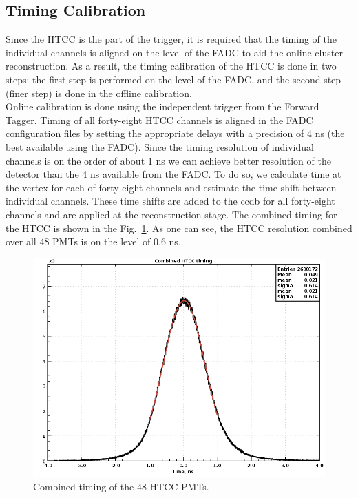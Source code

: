 \subsection{Timing Calibration} Since the HTCC is the part of the trigger, it is required that the timing of the individual channels is aligned on the level of the FADC to aid the online cluster reconstruction. As a result, the timing calibration of the HTCC is done in two steps: the first step is performed on the level of the FADC, and the second step (finer step) is done in the offline calibration. \\
\indent Online calibration is done using the independent trigger from the Forward Tagger. Timing of all forty-eight HTCC channels is aligned in the FADC configuration files by setting the appropriate delays with a precision of 4 ns (the best available using the FADC). Since the timing resolution of individual channels is on the order of about 1 ns we can achieve better resolution of the detector than the 4 ns available from the FADC. To do so, we calculate time at the vertex for each of forty-eight channels and estimate the time shift between individual channels. These time shifts are added to the ccdb for all forty-eight channels and are applied at the reconstruction stage. The combined timing for the HTCC is shown in the Fig.~\ref{fig:htcccombinedTimingResponce}. As one can see, the HTCC resolution combined over all 48 PMTs is on the level of 0.6 ns.
\begin{figure}[h]
\centering
\includegraphics[width=0.95\linewidth]{images/deltaTime6.png}
\caption{Combined timing of the 48 HTCC PMTs.}
\label{fig:htcccombinedTimingResponce}
\end{figure}
